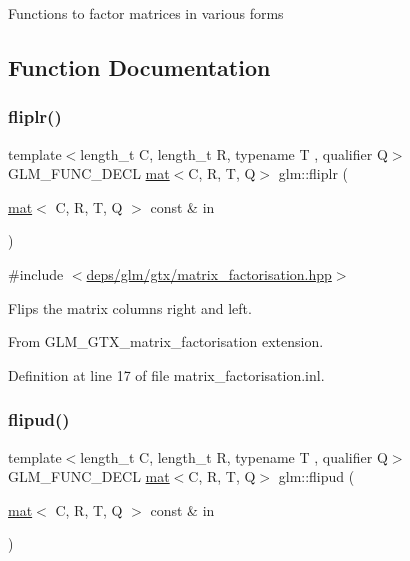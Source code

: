 Functions to factor matrices in various forms 

\subsection{Function Documentation}
\mbox{\label{group__gtx__matrix__factorisation_gaf39f4e5f78eb29c1a90277d45b9b3feb}} 
\subsubsection{\texorpdfstring{fliplr()}{fliplr()}}
{\footnotesize\ttfamily template$<$length\+\_\+t C, length\+\_\+t R, typename T , qualifier Q$>$ \\
G\+L\+M\+\_\+\+F\+U\+N\+C\+\_\+\+D\+E\+CL \hyperlink{structglm_1_1mat}{mat}$<$C, R, T, Q$>$ glm\+::fliplr (\begin{DoxyParamCaption}\item[{\hyperlink{structglm_1_1mat}{mat}$<$ C, R, T, Q $>$ const \&}]{in }\end{DoxyParamCaption})}



{\ttfamily \#include $<$\hyperlink{matrix__factorisation_8hpp}{deps/glm/gtx/matrix\+\_\+factorisation.\+hpp}$>$}

Flips the matrix columns right and left.

From G\+L\+M\+\_\+\+G\+T\+X\+\_\+matrix\+\_\+factorisation extension. 

Definition at line 17 of file matrix\+\_\+factorisation.\+inl.

\mbox{\label{group__gtx__matrix__factorisation_ga85003371f0ba97380dd25e8905de1870}} 
\subsubsection{\texorpdfstring{flipud()}{flipud()}}
{\footnotesize\ttfamily template$<$length\+\_\+t C, length\+\_\+t R, typename T , qualifier Q$>$ \\
G\+L\+M\+\_\+\+F\+U\+N\+C\+\_\+\+D\+E\+CL \hyperlink{structglm_1_1mat}{mat}$<$C, R, T, Q$>$ glm\+::flipud (\begin{DoxyParamCaption}\item[{\hyperlink{structglm_1_1mat}{mat}$<$ C, R, T, Q $>$ const \&}]{in }\end{DoxyParamCaption})}



